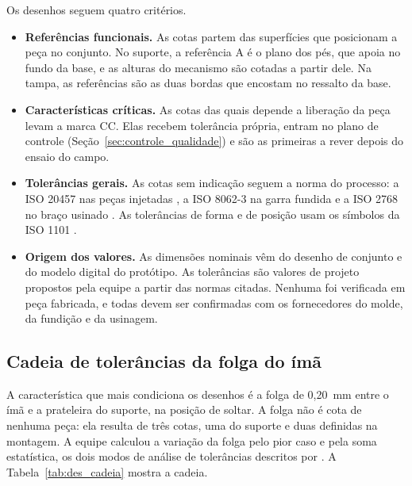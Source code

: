 Os desenhos seguem quatro critérios.

\begin{itemize}
    \item \textbf{Referências funcionais.} As cotas partem das superfícies que posicionam a peça no conjunto. No suporte, a referência A é o plano dos pés, que apoia no fundo da base, e as alturas do mecanismo são cotadas a partir dele. Na tampa, as referências são as duas bordas que encostam no ressalto da base.
    \item \textbf{Características críticas.} As cotas das quais depende a liberação da peça levam a marca CC. Elas recebem tolerância própria, entram no plano de controle (Seção~\ref{sec:controle_qualidade}) e são as primeiras a rever depois do ensaio do campo.
    \item \textbf{Tolerâncias gerais.} As cotas sem indicação seguem a norma do processo: a ISO 20457 nas peças injetadas \cite{iso20457}, a ISO 8062-3 na garra fundida \cite{iso8062} e a ISO 2768 no braço usinado \cite{iso2768}. As tolerâncias de forma e de posição usam os símbolos da ISO 1101 \cite{iso1101}.
    \item \textbf{Origem dos valores.} As dimensões nominais vêm do desenho de conjunto e do modelo digital do protótipo. As tolerâncias são valores de projeto propostos pela equipe a partir das normas citadas. Nenhuma foi verificada em peça fabricada, e todas devem ser confirmadas com os fornecedores do molde, da fundição e da usinagem.
\end{itemize}

\subsection{Cadeia de tolerâncias da folga do ímã}
\label{subsec:des_cadeia}

A característica que mais condiciona os desenhos é a folga de 0,20~mm entre o ímã e a prateleira do suporte, na posição de soltar. A folga não é cota de nenhuma peça: ela resulta de três cotas, uma do suporte e duas definidas na montagem. A equipe calculou a variação da folga pelo pior caso e pela soma estatística, os dois modos de análise de tolerâncias descritos por . A Tabela~\ref{tab:des_cadeia} mostra a cadeia.

